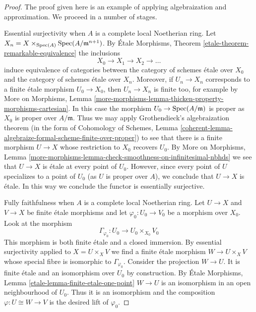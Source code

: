 \begin{proof}
The proof given here is an example of applying algebraization and
approximation. We proceed in a number of stages.

\medskip\noindent
Essential surjectivity when $A$ is a complete local Noetherian ring.
Let $X_n = X \times_{\mathop{\mathrm{Spec}}(A)} \mathop{\mathrm{Spec}}(A/\mathfrak m^{n + 1})$.
By \'Etale Morphisms, Theorem \ref{etale-theorem-remarkable-equivalence}
the inclusions
$$
X_0 \to X_1 \to X_2 \to \ldots
$$
induce equivalence of categories between the category
of schemes \'etale over $X_0$ and the category of schemes
\'etale over $X_n$.
Moreover, if $U_n \to X_n$ corresponds to a finite \'etale
morphism $U_0 \to X_0$, then $U_n \to X_n$ is finite too, for example
by More on Morphisms, Lemma
\ref{more-morphisms-lemma-thicken-property-morphisms-cartesian}.
In this case the morphism $U_0 \to \mathop{\mathrm{Spec}}(A/\mathfrak m)$
is proper as $X_0$ is proper over $A/\mathfrak m$. Thus we may apply
Grothendieck's algebraization theorem
(in the form of
Cohomology of Schemes, Lemma
\ref{coherent-lemma-algebraize-formal-scheme-finite-over-proper})
to see that there is a finite morphism $U \to X$ whose restriction
to $X_0$ recovers $U_0$. By More on Morphisms, Lemma
\ref{more-morphisms-lemma-check-smoothness-on-infinitesimal-nbhds}
we see that $U \to X$ is \'etale at every point of $U_0$.
However, since every point of $U$ specializes to a point of $U_0$
(as $U$ is proper over $A$), we conclude that $U \to X$ is \'etale.
In this way we conclude the functor is essentially surjective.

\medskip\noindent
Fully faithfulness when $A$ is a complete local Noetherian ring.
Let $U \to X$ and $V \to X$ be finite \'etale morphisms and
let $\varphi_0 : U_0 \to V_0$ be a morphism over $X_0$. Look at
the morphism
$$
\Gamma_{\varphi_0} : U_0 \longrightarrow U_0 \times_{X_0} V_0
$$
This morphism is both finite \'etale and a closed immersion.
By essential surjectivity applied to $X = U \times_X V$ we find
a finite \'etale morphism $W \to U \times_X V$ whose special
fibre is isomorphic to $\Gamma_{\varphi_0}$. Consider the projection
$W \to U$. It is finite \'etale and an isomorphism over $U_0$ by
construction. By \'Etale Morphisms, Lemma
\ref{etale-lemma-finite-etale-one-point}
$W \to U$ is an isomorphism in an open neighbourhood of $U_0$.
Thus it is an isomorphism and the composition $\varphi : U \cong W \to V$
is the desired lift of $\varphi_0$.


\end{proof}
